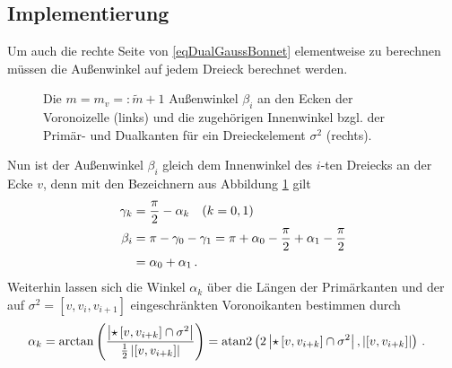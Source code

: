   \subsection{Implementierung}
    Um auch die rechte Seite von \eqref{eqDualGaussBonnet} elementweise zu berechnen müssen die Außenwinkel auf jedem Dreieck berechnet
    werden.
    \begin{figure}
      \begin{minipage}[t]{0.49\textwidth}
        \centering
      \end{minipage}
      \hfill
      \begin{minipage}[t]{0.49\textwidth}
        \centering
      \end{minipage}
      \caption[Außenwinkel der Voronoizelle]{Die \( m = m_{v} =: \tilde{m}+1 \) Außenwinkel \( \beta_{i} \) an den Ecken der
                                             Voronoizelle (links) 
                                             und die zugehörigen Innenwinkel bzgl. der Primär- und Dualkanten für ein Dreieckelement 
                                             \( \sigma^{2} \) (rechts).}
      \label{figGaussBonnetWinkel}
    \end{figure}
    Nun ist der Außenwinkel \( \beta_{i} \) gleich dem Innenwinkel des \( i \)-ten Dreiecks an der Ecke \( v \), denn mit den Bezeichnern
    aus Abbildung \ref{figGaussBonnetWinkel} gilt
    \begin{align}
      \gamma_{k} &= \frac{\pi}{2} - \alpha_{k} \quad (k = 0,1) \\
      \beta_{i} &= \pi - \gamma_{0} - \gamma_{1}
                 = \pi + \alpha_{0} - \frac{\pi}{2} + \alpha_{1} - \frac{\pi}{2} \\
                &= \alpha_{0} + \alpha_{1} \,\text{.}
    \end{align}
    Weiterhin lassen sich die Winkel \( \alpha_{k} \) über die Längen der Primärkanten und der auf
    \( \sigma^{2}=\left[ v, v_{i}, v_{i+1} \right] \) eingeschränkten Voronoikanten bestimmen durch
    \begin{align}
      \alpha_{k} &= \arctan\left( \frac{\left|\star\left[ v, v_{i+k} \right] \cap \sigma^{2} \right|}
                                    {\frac{1}{2}\left|\left[ v, v_{i+k} \right]\right|} \right)
                  = \text{atan2}\left( 2\left|\star\left[ v, v_{i+k} \right] \cap \sigma^{2} \right|, 
                                 \left|\left[ v, v_{i+k} \right]\right|\right) \,\text{.}
    \end{align}
